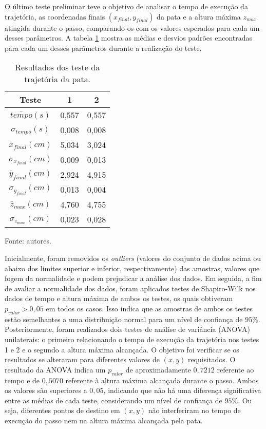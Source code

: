 \documentclass[../main.tex]{subfiles}
\begin{document}
  O último teste preliminar teve o objetivo de analisar o tempo de execução da trajetória, as coordenadas finais $(x_{final}, y_{final})$ da pata e a altura máxima $z_{max}$ atingida durante o passo, comparando-os com os valores esperados para cada um desses parâmetros. A tabela \ref{tab:trajetoria} mostra as médias e desvios padrões encontradas para cada um desses parâmetros durante a realização do teste.

  \begin{table}[!htb]
    \caption{Resultados dos teste da trajetória da pata.}
    \centering
    \begin{tabular}{ccc}
      \hline
      \textbf{Teste} & \textbf{1}      & \textbf{2}  \\
      \hline
      $\bar{tempo} (s)$         & 0,557  & 0,557 \\
      \hline
      $\sigma_{tempo} (s)$       & 0,008  & 0,008 \\
      \hline
      $\bar{x}_{final} (cm)$     & 5,034  & 3,024 \\
      \hline
      $\sigma_{x_{final}} (cm)$  & 0,009  & 0,013 \\
      \hline
      $\bar{y}_{final} (cm)$     & 2,924  & 4,915 \\      
      \hline
      $\sigma_{y_{final}} (cm)$  & 0,013  & 0,004 \\      
      \hline
      $\bar{z}_{max} (cm)$       & 4,760  & 4,755 \\      
      \hline
      $\sigma_{z_{max}} (cm)$    & 0,023  & 0,028 \\
      \hline   
    \end{tabular}

    Fonte: autores.
    \label{tab:trajetoria}
  \end{table}
  
  \vspace{-\parskip}

  Inicialmente, foram removidos os \textit{outliers} (valores do conjunto de dados acima ou abaixo dos limites superior e inferior, respectivamente) das amostras, valores que fogem da normalidade e podem prejudicar a análise dos dados. Em seguida, a fim de avaliar a normalidade dos dados, foram aplicados testes de Shapiro-Wilk nos dados de tempo e altura máxima de ambos os testes, os quais obtiveram $p_{valor} > 0,05$ em todos os casos. Isso indica que as amostras de ambos os testes estão semelhantes a uma distribuição normal para um nível de confiança de $95\%$. Posteriormente, foram realizados dois testes de análise de variância (ANOVA) unilaterais: o primeiro relacionando o tempo de execução da trajetória nos testes 1 e 2 e o segundo a altura máxima alcançada. O objetivo foi verificar se os resultados se alteraram para diferentes valores de $(x, y)$ requisitados. O resultado da ANOVA indica um $p_{valor}$ de aproximadamente $0,7212$ referente ao tempo e de $0,5070$ referente à altura máxima alcançada durante o passo. Ambos os valores são superiores a $0,05$, indicando que não há uma diferença significativa entre as médias de cada teste, considerando um nível de confiança de $95\%$. Ou seja, diferentes pontos de destino em $(x, y)$ não interferiram no tempo de execução do passo nem na altura máxima alcançada pela pata.
\end{document}
